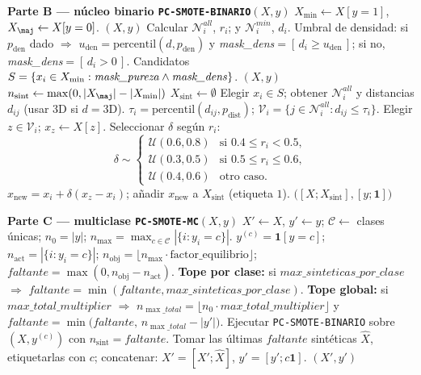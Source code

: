 \documentclass{article}
\begin{document}
\begin{algorithm}
\begin{adjustwidth}{-0.6cm}{-0.6cm}
\begin{algorithmic}[1]
\Statex \textbf{Parte B — núcleo binario \texttt{PC-SMOTE-BINARIO}$(X,y)$}
\State $X_{\min}\gets X[y=1]$, $X_{\maj}\gets X[y=0]$.  \State \Return $(X,y)$ \EndIf
\State Calcular $\mathcal{N}^{all}_i$, $r_i$; y $\mathcal{N}^{min}_i$, $d_i$.
\State Umbral de densidad: si $p_{\text{den}}$ dado $\Rightarrow$
$u_{\text{den}}=\mathrm{percentil}(d,p_{\text{den}})$ y \emph{mask\_dens}$=[\,d_i\ge u_{\text{den}}\,]$;
si no, \emph{mask\_dens}$=[\,d_i>0\,]$.
\State Candidatos $S=\{x_i\in X_{\min}:\text{\emph{mask\_pureza}}\land\text{\emph{mask\_dens}}\}$.
 \State \Return $(X,y)$ \EndIf
\State $n_{\text{sint}} \gets \max(0, |X_{\maj}| - |X_{\min}|)$ 
\State $X_{\text{sint}}\gets\emptyset$
  \State Elegir $x_i\in S$; obtener $\mathcal{N}^{all}_i$ y distancias $d_{ij}$ (usar 3D si $d=\text{3D}$).
  \State $\tau_i=\mathrm{percentil}(d_{ij},p_{\text{dist}})$; 
  $\mathcal{V}_i=\{j\in\mathcal{N}^{all}_i: d_{ij}\le \tau_i\}$.
   \State \Continue \EndIf
  \State Elegir $z\in\mathcal{V}_i$; $x_z\gets X[z]$.
  \State Seleccionar $\delta$ según $r_i$:
  \[
  \delta\sim
  \begin{cases}
  \mathcal{U}(0.6,0.8) & \text{si } 0.4\le r_i<0.5,\\
  \mathcal{U}(0.3,0.5) & \text{si } 0.5\le r_i\le 0.6,\\
  \mathcal{U}(0.4,0.6) & \text{otro caso.}
  \end{cases}
  \]
  \State $x_{\text{new}}=x_i+\delta(x_z-x_i)$; añadir $x_{\text{new}}$ a $X_{\text{sint}}$ (etiqueta $1$).
\EndWhile
\State \Return $\big([X;X_{\text{sint}}],[y;\mathbf{1}]\big)$

\Statex \textbf{Parte C — multiclase \texttt{PC-SMOTE-MC}$(X,y)$}
\State $X'\gets X$, $y'\gets y$; $\mathcal{C}\gets$ clases únicas; $n_0=|y|$; $n_{\max}=\max_{c\in\mathcal{C}}|\{i:y_i=c\}|$.
  \State $y^{(c)}=\mathbf{1}[y=c]$; $n_{\text{act}}=|\{i:y_i=c\}|$;
  $n_{\text{obj}}=\lfloor n_{\max}\cdot\text{factor\_equilibrio}\rfloor$;
  $faltante=\max(0,n_{\text{obj}}-n_{\text{act}})$.
  \State \textbf{Tope por clase:} si $max\_sinteticas\_por\_clase$ $\Rightarrow$ $faltante=\min(faltante,max\_sinteticas\_por\_clase)$.
  \State \textbf{Tope global:} si $max\_total\_multiplier$ $\Rightarrow$
  $n_{\max\_total}=\lfloor n_0\cdot max\_total\_multiplier\rfloor$ y 
  $faltante=\min\!\big(faltante,\,n_{\max\_total}-|y'|\big)$.
   \State \Continue \EndIf
  \State Ejecutar \texttt{PC-SMOTE-BINARIO} sobre $(X,y^{(c)})$ con $n_{\text{sint}}=faltante$.
  \State Tomar las últimas $faltante$ sintéticas $\hat X$, etiquetarlas con $c$;
  concatenar: $X'=[X';\hat X]$, $y'=[y';c\mathbf{1}]$.
\EndFor
\State \Return $(X',y')$

\end{algorithmic}
\end{adjustwidth}
\end{algorithm}
\end{document}
